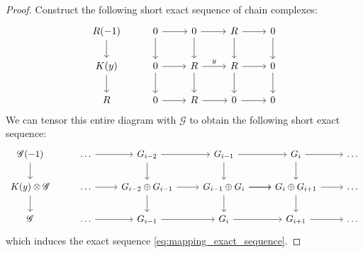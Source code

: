 \documentclass[12pt]{article}
\theoremstyle{plain}
\theoremstyle{definition}
\newcommand{\scr}[1]{\mathscr{#1}}
\begin{document}
\begin{proof}
Construct the following short exact sequence of chain complexes:
\begin{equation}
\begin{tikzcd}
R(-1)\arrow[d] & 0\arrow[r]\arrow[d] & 0\arrow[r]\arrow[d] & R\arrow[r]\arrow[d] & 0\arrow[d]\\
K(y)\arrow[d] & 0\arrow[r]\arrow[d] & R\arrow[r,"{y}"]\arrow[d] & R\arrow[r]\arrow[d] & 0\arrow[d]\\
R &0\arrow[r] & R\arrow[r] & 0\arrow[r] & 0
\end{tikzcd}
\end{equation}
We can tensor this entire diagram with $\scr{G}$ to obtain the following short exact sequence:
\begin{equation}
\begin{tikzcd}
\scr{G}(-1)\arrow[d] & \hdots\arrow[r] & G_{i-2}\arrow[r]\arrow[d] & G_{i-1}\arrow[r]\arrow[d] & G_i\arrow[r]\arrow[d] & \hdots\\
K(y)\otimes \scr{G}\arrow[d] & \hdots\arrow[r] & G_{i-2} \oplus G_{i-1}\arrow[r]\arrow[d] & G_{i-1} \oplus G_i\arrow[r]\arrow[d]\arrow[r] & G_{i} \oplus G_{i+1}\arrow[r]\arrow[d] & \hdots\\
\scr{G} & \hdots\arrow[r] & G_{i-1}\arrow[r] & G_i\arrow[r] & G_{i+1}\arrow[r] & \hdots
\end{tikzcd}
\end{equation}
which induces the exact sequence \eqref{eq:mapping_exact_sequence}.
\end{proof}
\end{document}
